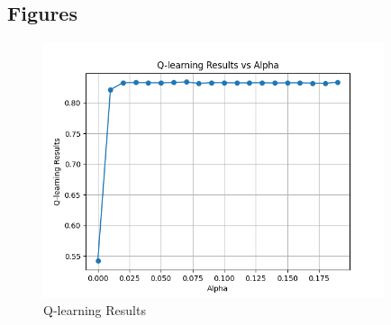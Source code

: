 \documentclass{article}
\begin{document}
\begin{appendices}
\section*{Figures}
\begin{figure}[ht]
    \centering
    \includegraphics[width=100mm]{Q_learning_results.png}
    \caption{Q-learning Results}
    \label{fig:q-learning-results}
\end{figure}
\end{appendices}
\end{document}
